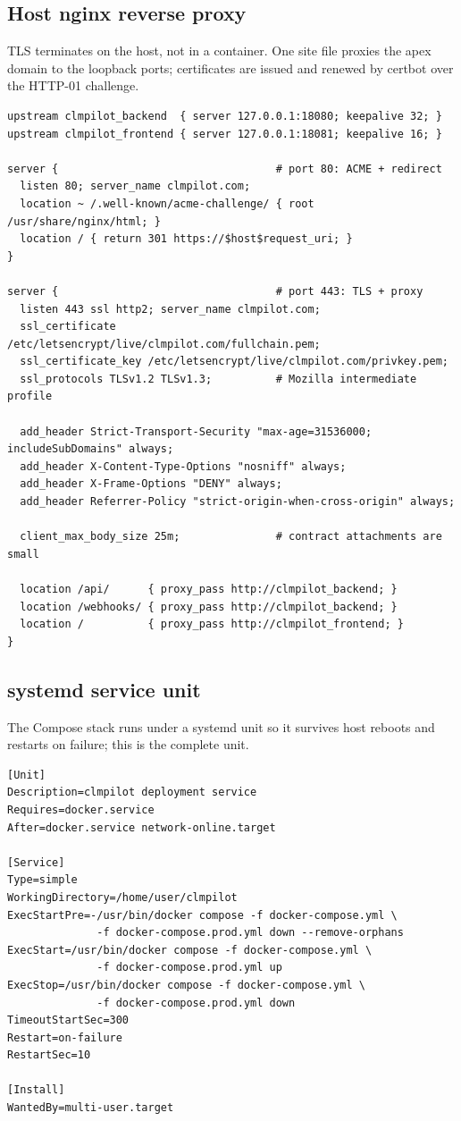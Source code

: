 \subsection{Host nginx reverse proxy}

TLS terminates on the host, not in a container. One site file proxies
the apex domain to the loopback ports; certificates are issued and
renewed by certbot over the HTTP-01 challenge.

\begin{lstlisting}[language=nginxcfg]
upstream clmpilot_backend  { server 127.0.0.1:18080; keepalive 32; }
upstream clmpilot_frontend { server 127.0.0.1:18081; keepalive 16; }

server {                                  # port 80: ACME + redirect
  listen 80; server_name clmpilot.com;
  location ~ /.well-known/acme-challenge/ { root /usr/share/nginx/html; }
  location / { return 301 https://$host$request_uri; }
}

server {                                  # port 443: TLS + proxy
  listen 443 ssl http2; server_name clmpilot.com;
  ssl_certificate     /etc/letsencrypt/live/clmpilot.com/fullchain.pem;
  ssl_certificate_key /etc/letsencrypt/live/clmpilot.com/privkey.pem;
  ssl_protocols TLSv1.2 TLSv1.3;          # Mozilla intermediate profile

  add_header Strict-Transport-Security "max-age=31536000; includeSubDomains" always;
  add_header X-Content-Type-Options "nosniff" always;
  add_header X-Frame-Options "DENY" always;
  add_header Referrer-Policy "strict-origin-when-cross-origin" always;

  client_max_body_size 25m;               # contract attachments are small

  location /api/      { proxy_pass http://clmpilot_backend; }
  location /webhooks/ { proxy_pass http://clmpilot_backend; }
  location /          { proxy_pass http://clmpilot_frontend; }
}
\end{lstlisting}

\subsection{systemd service unit}

The Compose stack runs under a systemd unit so it survives host
reboots and restarts on failure; this is the complete unit.

\begin{lstlisting}[language=systemdcfg]
[Unit]
Description=clmpilot deployment service
Requires=docker.service
After=docker.service network-online.target

[Service]
Type=simple
WorkingDirectory=/home/user/clmpilot
ExecStartPre=-/usr/bin/docker compose -f docker-compose.yml \
              -f docker-compose.prod.yml down --remove-orphans
ExecStart=/usr/bin/docker compose -f docker-compose.yml \
              -f docker-compose.prod.yml up
ExecStop=/usr/bin/docker compose -f docker-compose.yml \
              -f docker-compose.prod.yml down
TimeoutStartSec=300
Restart=on-failure
RestartSec=10

[Install]
WantedBy=multi-user.target
\end{lstlisting}

